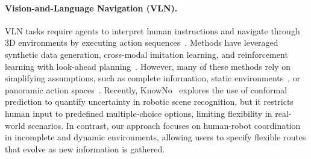 
\paragraph{Vision-and-Language Navigation (VLN).}
VLN tasks require agents to interpret human instructions and navigate through 3D environments by executing action sequences~\cite{anderson2018vision}. 
Methods have leveraged synthetic data generation, cross-modal imitation learning, and reinforcement learning with look-ahead planning~\cite{fried2018speaker,wang2019reinforced,wang2018look}. 
However, many of these methods rely on simplifying assumptions, such as complete information, static environments~\cite{kolve2017ai2,puig2023habitat,xia2018gibson}, or panoramic action spaces~\cite{fried2018speaker}. Recently, KnowNo~\cite{ren2023robots} explores the use of conformal prediction to quantify uncertainty in robotic scene recognition, but it restricts human input to predefined multiple-choice options, limiting flexibility in real-world scenarios.
In contrast, our approach focuses on human-robot coordination in incomplete and dynamic environments, allowing users to specify flexible routes that evolve as new information is gathered.
